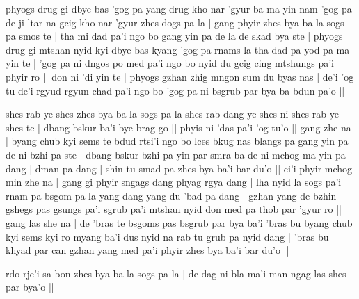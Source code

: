 \documentclass[11pt,twoside]{article}\makeatletter
\begin{document}
\label{TV14.2}phyogs drug gi dbye bas 'gog pa yang drug kho nar 'gyur ba ma yin nam 'gog pa de ji ltar na gcig kho nar 'gyur zhes dogs pa la | gang phyir zhes bya ba la sogs pa smos te | tha mi dad pa'i ngo bo gang yin pa de la de skad bya ste | phyogs drug gi mtshan nyid kyi dbye bas kyang 'gog pa rnams la tha dad pa yod pa ma yin te | 'gog pa ni dngos po med pa'i ngo bo nyid du gcig cing mtshungs pa'i phyir ro || don ni 'di yin te | phyogs gzhan zhig mngon sum du byas nas | de'i 'og tu de'i rgyud rgyun chad pa'i ngo bo 'gog pa ni bsgrub par bya ba bdun pa'o || 
\par
\label{TV15}shes rab ye shes zhes bya ba la sogs pa la shes rab dang ye shes ni shes rab ye shes te | dbang bskur ba'i bye brag go || phyis ni 'das pa'i 'og tu'o || gang zhe na | byang chub kyi sems te bdud rtsi'i ngo bo lces bkug nas blangs pa gang yin pa de ni bzhi pa ste | dbang bskur bzhi pa yin par smra ba de ni mchog ma yin pa dang | dman pa dang | shin tu smad pa zhes bya ba'i bar du'o || ci'i phyir mchog min zhe na | gang gi phyir sngags dang phyag rgya dang | lha nyid la sogs pa'i rnam pa bsgom pa la yang dang yang du 'bad pa dang | gzhan yang de bzhin gshegs pas gsungs pa'i sgrub pa'i mtshan nyid don med pa thob par 'gyur ro || gang las she na | de 'bras te bsgoms pas bsgrub par bya ba'i 'bras bu byang chub kyi sems kyi ro myang ba'i dus nyid na rab tu grub pa nyid dang | 'bras bu khyad par can gzhan yang med pa'i phyir zhes bya ba'i bar du'o || 
\par
\label{TV16} 
\par
\label{TV17}rdo rje'i sa bon zhes bya ba la sogs  pa la | de dag ni bla ma'i man ngag las shes par bya'o ||
\par
\end{document}
